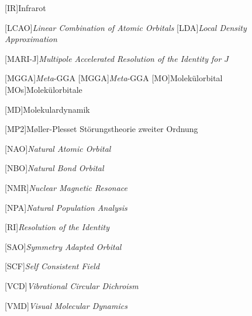 \begin{acronym}[SEPSEP]
	[IR]{Infrarot}
		
	[LCAO]{\textit{Linear Combination of Atomic Orbitals}}
	[LDA]{\textit{Local Density Approximation}}
     
    [MARI-J]{\textit{Multipole Accelerated Resolution of the Identity for $J$}} 	
 	
	[MGGA]{\textit{Meta}-GGA}   
		{\textit{Meta}-GGA}	
	[MO]{Molekülorbital}   
		[MOs]{Molekülorbitale}
		
	[MD]{Molekulardynamik}
	
	[MP2]{M\o ller-Plesset Störungstheorie zweiter Ordnung}
		
    [NAO]{\textit{Natural Atomic Orbital}}

    [NBO]{\textit{Natural Bond Orbital}}
    
    [NMR]{\textit{Nuclear Magnetic Resonace}}
        
    [NPA]{\textit{Natural Population Analysis}}
      
    [RI]{\textit{Resolution of the Identity}}
    
    [SAO]{\textit{Symmetry Adapted Orbital}}
    
	[SCF]{\textit{Self Consistent Field}}   
		
	[VCD]{\textit{Vibrational Circular Dichroism}}
     
    [VMD]{\textit{Visual Molecular Dynamics}}
\end{acronym}